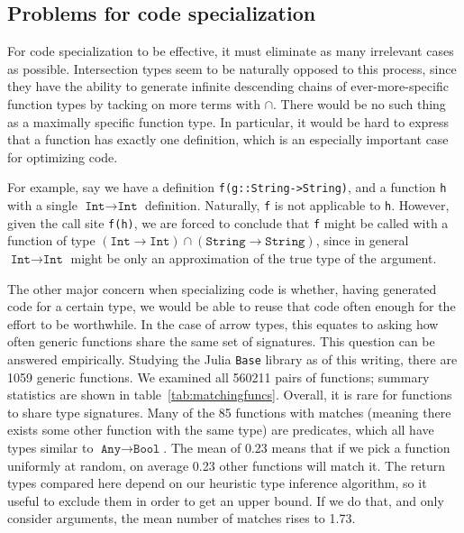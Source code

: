 \subsection{Problems for code specialization}

For code specialization to be effective, it must eliminate as many
irrelevant cases as possible. Intersection types seem to be naturally
opposed to this process, since they have the ability to
generate infinite descending chains of ever-more-specific function
types by tacking on more terms with $\cap$. There would be no such
thing as a maximally specific function type. In particular, it would be
hard to express that a function has exactly one definition,
which is an especially important case for optimizing code.

For example, say we have a definition \texttt{f(g::String->String)},
and a function \texttt{h} with a single $\texttt{Int}\rightarrow\texttt{Int}$ definition.
Naturally, \texttt{f} is not applicable to \texttt{h}.
However, given the call site \texttt{f(h)}, we are forced to conclude
that \texttt{f} might be called with a function of type
\mbox{$(\texttt{Int}\rightarrow\texttt{Int})\cap(\texttt{String}\rightarrow\texttt{String})$},
since in general $\texttt{Int}\rightarrow\texttt{Int}$ might be only an
approximation of the true type of the argument.


The other major concern when specializing code is whether, having generated code
for a certain type, we would be able to reuse that code often enough for the
effort to be worthwhile.
In the case of arrow types, this equates to asking how often generic functions
share the same set of signatures.
This question can be answered empirically.
Studying the Julia \texttt{Base} library as of this writing, there are 1059
generic functions. We examined all 560211 pairs of functions; summary
statistics are shown in table~\ref{tab:matchingfuncs}.
Overall, it is rare for functions to share type signatures.
Many of the 85 functions with matches (meaning there exists some other function
with the same type) are predicates, which all have types similar to
$\texttt{Any}\rightarrow \texttt{Bool}$. The mean of 0.23 means that if we
pick a function uniformly at random, on average 0.23 other functions will
match it.
The return types compared here depend on our heuristic type inference algorithm,
so it useful to exclude them in order to get an upper bound.
If we do that, and only consider arguments, the mean number of matches rises to 1.73.


